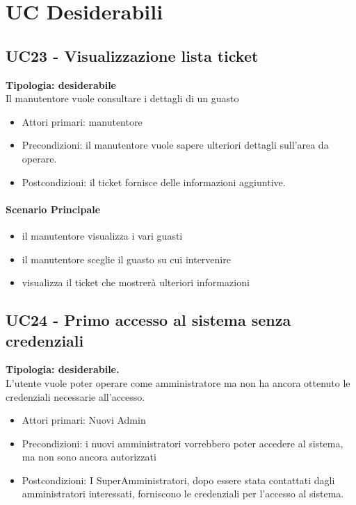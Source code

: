 \documentclass[12pt]{article}
\begin{document}
\section{UC Desiderabili}

\subsection{UC23 - Visualizzazione lista ticket}
\textbf{Tipologia: desiderabile}\\
Il manutentore vuole consultare i dettagli di un guasto
\begin{itemize}
	\item Attori primari: manutentore
	\item Precondizioni: il manutentore vuole sapere ulteriori dettagli sull'area da operare.
	\item Postcondizioni: il ticket fornisce delle informazioni aggiuntive.
\end{itemize}
\paragraph{Scenario Principale}
\begin{itemize}
	\item il manutentore visualizza i vari guasti
	\item il manutentore sceglie il guasto su cui intervenire
	\item visualizza il ticket che mostrerà ulteriori informazioni
\end{itemize}


\subsection{UC24 - Primo accesso al sistema senza credenziali}
\textbf{Tipologia: desiderabile.} \\
L'utente vuole poter operare come amministratore ma non ha ancora ottenuto le credenziali necessarie all'accesso.
\begin{itemize}
	\item Attori primari: Nuovi Admin
	\item Precondizioni: i nuovi amministratori vorrebbero poter accedere al sistema, ma non sono ancora autorizzati
	\item Postcondizioni: I SuperAmministratori, dopo essere stata contattati dagli amministratori interessati, forniscono le credenziali per l'accesso al sistema.
\end{itemize}
\end{document}
